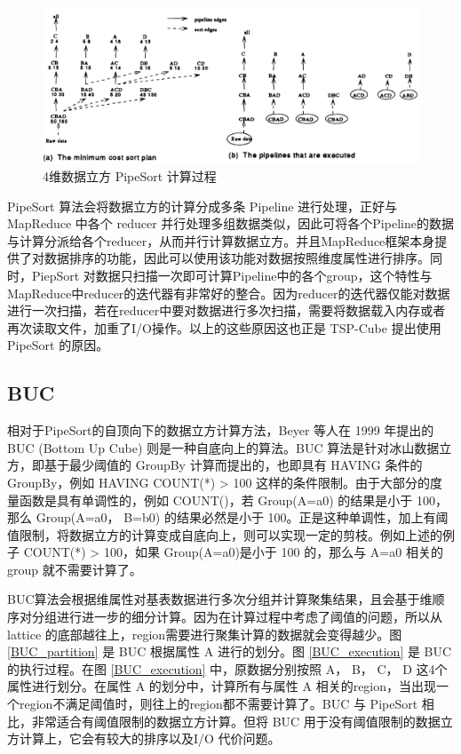 \begin{figure}[!htb]
\centering\includegraphics[width=5.5in]{picture/ch_current_research/pipesort} 
\caption{4维数据立方 PipeSort 计算过程}\label{pipesort} 
\end{figure} 

PipeSort 算法会将数据立方的计算分成多条 Pipeline 进行处理，正好与 MapReduce 中各个 reducer 并行处理多组数据类似，因此可将各个Pipeline的数据与计算分派给各个reducer，从而并行计算数据立方。并且MapReduce框架本身提供了对数据排序的功能，因此可以使用该功能对数据按照维度属性进行排序。同时，PiepSort 对数据只扫描一次即可计算Pipeline中的各个group，这个特性与MapReduce中reducer的迭代器有非常好的整合。因为reducer的迭代器仅能对数据进行一次扫描，若在reducer中要对数据进行多次扫描，需要将数据载入内存或者再次读取文件，加重了I/O操作。以上的这些原因这也正是 TSP-Cube 提出使用 PipeSort 的原因。

\subsection{BUC}

相对于PipeSort的自顶向下的数据立方计算方法，Beyer 等人在 1999 年提出的 BUC (Bottom Up Cube) 则是一种自底向上的算法。BUC 算法是针对冰山数据立方，即基于最少阈值的 GroupBy 计算而提出的，也即具有 HAVING 条件的 GroupBy，例如 HAVING COUNT(*) > 100 这样的条件限制。由于大部分的度量函数是具有单调性的，例如 COUNT()，若 Group(A=a0) 的结果是小于 100，那么 Group(A=a0， B=b0) 的结果必然是小于 100。正是这种单调性，加上有阈值限制，将数据立方的计算变成自底向上，则可以实现一定的剪枝。例如上述的例子 COUNT(*) > 100，如果 Group(A=a0)是小于 100 的，那么与 A=a0 相关的 group 就不需要计算了。

BUC算法会根据维属性对基表数据进行多次分组并计算聚集结果，且会基于维顺序对分组进行进一步的细分计算。因为在计算过程中考虑了阈值的问题，所以从 lattice 的底部越往上，region需要进行聚集计算的数据就会变得越少。图 \ref{BUC_partition} 是 BUC 根据属性 A 进行的划分。图 \ref{BUC_execution} 是 BUC 的执行过程。在图 \ref{BUC_execution} 中，原数据分别按照 A， B， C， D 这4个属性进行划分。在属性 A 的划分中，计算所有与属性 A 相关的region，当出现一个region不满足阈值时，则往上的region都不需要计算了。BUC 与 PipeSort 相比，非常适合有阈值限制的数据立方计算。但将 BUC 用于没有阈值限制的数据立方计算上，它会有较大的排序以及I/O 代价问题。

